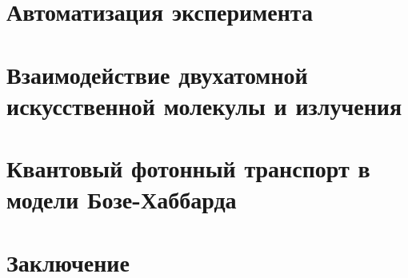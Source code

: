 \documentclass[14pt, a4paper]{extreport}
\renewcommand*\thesection{\arabic{section}}
\numberwithin{equation}{section}
\renewcommand*\thesection{\arabic{chapter}.\arabic{section}}
\begin{document}
\chapter{Автоматизация эксперимента}

\chapter{Взаимодействие двухатомной искусственной молекулы и излучения}

\chapter{Квантовый фотонный транспорт в модели Бозе-Хаббарда}

\chapter{Заключение}


\appendix
\renewcommand*\thesection{\Alph{chapter}.\arabic{section}}


\renewcommand\bibname{Список литературы}


\end{document}
